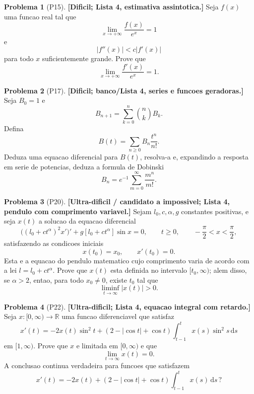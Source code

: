 \documentclass[10pt,a4paper]{amsart}
\newcommand{\R}{\mathbb{R}}
\renewcommand{\d}{\mathrm{d}}
\theoremstyle{definition}
\newtheorem{problema}{Problema}
\begin{document}
\begin{problema}[P15]
\textbf{[Dificil; Lista 4, estimativa assintotica.]}
Seja $f(x)$ uma funcao real tal que
\[
    \lim_{x\to+\infty}\frac{f(x)}{e^x}=1
\]
e
\[
    |f''(x)|<c|f'(x)|
\]
para todo $x$ suficientemente grande. Prove que
\[
    \lim_{x\to+\infty}\frac{f'(x)}{e^x}=1.
\]
\end{problema}

\begin{problema}[P17]
\textbf{[Dificil; banco/Lista 4, series e funcoes geradoras.]}
Seja $B_0=1$ e
\[
    B_{n+1}=\sum_{k=0}^n \binom{n}{k}B_k.
\]
Defina
\[
    B(t)=\sum_{n\ge 0}B_n\frac{t^n}{n!}.
\]
Deduza uma equacao diferencial para $B(t)$, resolva-a e, expandindo a
resposta em serie de potencias, deduza a formula de Dobinski
\[
    B_n=e^{-1}\sum_{m=0}^{\infty}\frac{m^n}{m!}.
\]
\end{problema}

\begin{problema}[P20]
\textbf{[Ultra-dificil / candidato a impossivel; Lista 4, pendulo com
comprimento variavel.]}
Sejam $l_0,c,\alpha,g$ constantes positivas, e seja $x(t)$ a solucao da
equacao diferencial
\[
    \bigl((l_0+ct^\alpha)^2x'\bigr)'
    +g[l_0+ct^\alpha]\sin x=0,
    \qquad t\ge 0,\qquad -\frac{\pi}{2}<x<\frac{\pi}{2},
\]
satisfazendo as condicoes iniciais
\[
    x(t_0)=x_0,\qquad x'(t_0)=0.
\]
Esta e a equacao do pendulo matematico cujo comprimento varia de acordo com
a lei $l=l_0+ct^\alpha$. Prove que $x(t)$ esta definida no intervalo
$[t_0,\infty)$; alem disso, se $\alpha>2$, entao, para todo $x_0\neq 0$,
existe $t_0$ tal que
\[
    \liminf_{t\to\infty}|x(t)|>0.
\]
\end{problema}

\begin{problema}[P22]
\textbf{[Ultra-dificil; Lista 4, equacao integral com retardo.]}
Seja $x:[0,\infty)\to\R$ uma funcao diferenciavel que satisfaz
\[
    x'(t)
    =
    -2x(t)\sin^2 t
    +
    (2-|\cos t|+\cos t)
    \int_{t-1}^{t}x(s)\sin^2 s\,\d s
\]
em $[1,\infty)$. Prove que $x$ e limitada em $[0,\infty)$ e que
\[
    \lim_{t\to\infty}x(t)=0.
\]
A conclusao continua verdadeira para funcoes que satisfazem
\[
    x'(t)
    =
    -2x(t)
    +
    (2-|\cos t|+\cos t)
    \int_{t-1}^{t}x(s)\,\d s\,?
\]
\end{problema}
\end{document}
